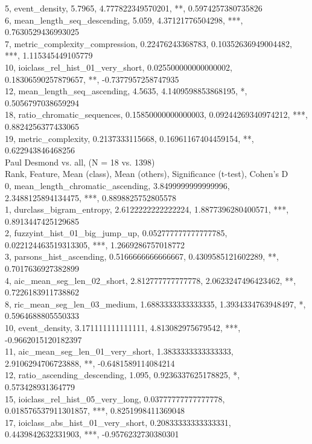 5, event_density, 5.7965, 4.777822349570201, **, 0.5974257380735826\\
6, mean_length_seq_descending, 5.059, 4.37121776504298, ***, 0.7630529436993025\\
7, metric_complexity_compression, 0.22476243368783, 0.10352636949004482, ***, 1.115345449105779\\
10, ioiclass_rel_hist_01_very_short, 0.025500000000000002, 0.18306590257879657, **, -0.7377957258747935\\
12, mean_length_seq_ascending, 4.5635, 4.1409598853868195, *, 0.5056797038659294\\
18, ratio_chromatic_sequences, 0.15850000000000003, 0.09244269340974212, ***, 0.8824256377433065\\
19, metric_complexity, 0.2137333115668, 0.16961167404459154, **, 0.622943846468256\\
Paul Desmond vs. all, (N = 18 vs. 1398)\\
Rank, Feature, Mean (class), Mean (others), Significance (t-test), Cohen's D\\
0, mean_length_chromatic_ascending, 3.8499999999999996, 2.3488125894134475, ***, 0.8898825752805578\\
1, durclass_bigram_entropy, 2.6122222222222224, 1.8877396280400571, ***, 0.8913447425129685\\
2, fuzzyint_hist_01_big_jump_up, 0.052777777777777785, 0.022124463519313305, ***, 1.2669286757018772\\
3, parsons_hist_ascending, 0.5166666666666667, 0.4309585121602289, **, 0.7017636927382899\\
4, aic_mean_seg_len_02_short, 2.812777777777778, 2.0623247496423462, **, 0.7226183911738862\\
8, ric_mean_seg_len_03_medium, 1.6883333333333335, 1.3934334763948497, *, 0.5964688805550333\\
10, event_density, 3.171111111111111, 4.813082975679542, ***, -0.9662015120182397\\
11, aic_mean_seg_len_01_very_short, 1.3833333333333333, 2.9106294706723888, **, -0.6481589114084214\\
12, ratio_ascending_descending, 1.095, 0.9236337625178825, *, 0.573428931364779\\
15, ioiclass_rel_hist_05_very_long, 0.03777777777777778, 0.018576537911301857, ***, 0.8251998411369048\\
17, ioiclass_abs_hist_01_very_short, 0.20833333333333331, 0.4439842632331903, ***, -0.9576232730380301\\

